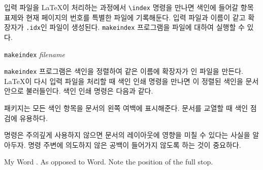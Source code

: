 입력 파일을 \LaTeX 이 처리하는 과정에서 \verb|\index| 명령을 만나면 색인에 들어갈 항목표제와 현재 페이지의 번호를 특별한 파일에 기록해둔다.
입력 파일과 이름이 같고 확장자가 \verb|.idx|인 파일이 생성된다. \texttt{makeindex} 프로그램을  파일에 대하여 실행할 수 있다.

\begin{lscommand}
  \texttt{makeindex} \emph{filename}
\end{lscommand}
\texttt{makeindex} 프로그램은 색인을 정렬하여 같은 이름에 확장자가 인 파일을 만든다. \LaTeX 이 다시 입력 파일을 처리할 때 색인 인쇄 명령을 만나면 이 정렬된 색인을 문서 안으로 불러들인다. 색인 인쇄 명령은 다음과 같다.
\begin{lscommand}
\end{lscommand}


 패키지는 모든 색인 항목을 문서의 왼쪽 여백에 표시해준다.
문서를 교열할 때 색인 점검에 유용하다.

 명령은 주의깊게 사용하지 않으면 문서의 레이아웃에 영향을 미칠 수 있다는 사실을 알아두자.  명령 주변에 의도하지 않은 공백이 들어가지 않도록 하는 것이 중요하다.

\begin{example}
My Word . As opposed
to Word. Note the
position of the full stop.
\end{example}

